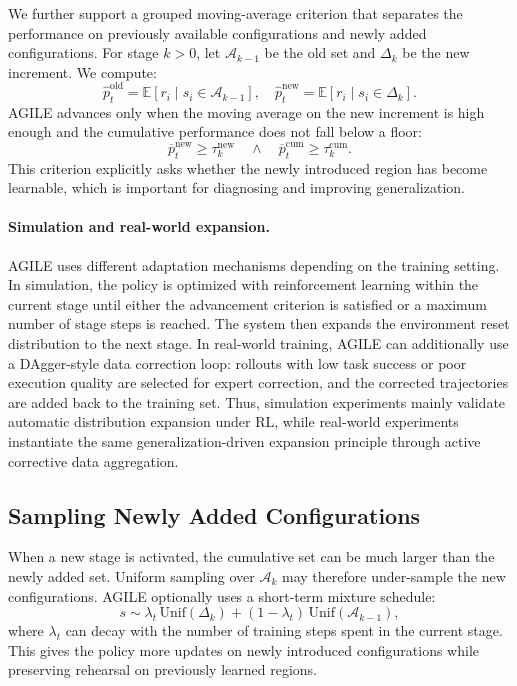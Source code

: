 We further support a grouped moving-average criterion that separates the
performance on previously available configurations and newly added
configurations. For stage $k>0$, let $\mathcal{A}_{k-1}$ be the old set and
$\Delta_k$ be the new increment. We compute:
\begin{equation}
    \hat{p}^{\mathrm{old}}_t =
    \mathbb{E}[r_i \mid s_i \in \mathcal{A}_{k-1}],
    \quad
    \hat{p}^{\mathrm{new}}_t =
    \mathbb{E}[r_i \mid s_i \in \Delta_k].
\end{equation}
AGILE advances only when the moving average on the new increment is high enough
and the cumulative performance does not fall below a floor:
\begin{equation}
    \overline{p}^{\mathrm{new}}_t \geq \tau^{\mathrm{new}}_k
    \quad \land \quad
    \overline{p}^{\mathrm{cum}}_t \geq \tau^{\mathrm{cum}}_k.
\end{equation}
This criterion explicitly asks whether the newly introduced region has become
learnable, which is important for diagnosing and improving generalization.

\paragraph{Simulation and real-world expansion.}
AGILE uses different adaptation mechanisms depending on the training setting.
In simulation, the policy is optimized with reinforcement learning within the
current stage until either the advancement criterion is satisfied or a maximum
number of stage steps is reached. The system then expands the environment reset
distribution to the next stage. In real-world training, AGILE can additionally
use a DAgger-style data correction loop: rollouts with low task success or poor
execution quality are selected for expert correction, and the corrected
trajectories are added back to the training set. Thus, simulation experiments
mainly validate automatic distribution expansion under RL, while real-world
experiments instantiate the same generalization-driven expansion principle
through active corrective data aggregation.

\subsection{Sampling Newly Added Configurations}
\label{subsec:mixing}

When a new stage is activated, the cumulative set can be much larger than the
newly added set. Uniform sampling over $\mathcal{A}_k$ may therefore under-sample
the new configurations. AGILE optionally uses a short-term mixture schedule:
\begin{equation}
    s \sim
    \lambda_t \, \mathrm{Unif}(\Delta_k)
    + (1-\lambda_t) \, \mathrm{Unif}(\mathcal{A}_{k-1}),
\end{equation}
where $\lambda_t$ can decay with the number of training steps spent in the
current stage. This gives the policy more updates on newly introduced
configurations while preserving rehearsal on previously learned regions.

